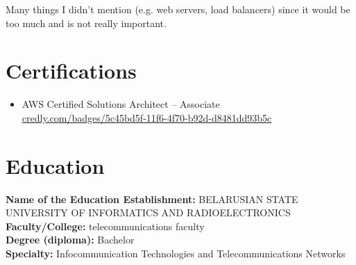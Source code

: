 \documentclass[11pt]{letter}
\newcommand{\forceindent}{\leavevmode{\parindent=1em\indent} %
}
\begin{document}
\forceindent Many things I didn't mention (e.g. web servers, load balancers) since it would be too much and is not really important.
\newpage

\section*{Certifications\vphantom{certs}}

\begin{itemize}
    \item AWS Certified Solutions Architect – Associate \\
    \href{https://www.credly.com/badges/5c45bd5f-11f6-4f70-b92d-d8481dd93b5c}{credly.com/badges/5c45bd5f-11f6-4f70-b92d-d8481dd93b5c}
\end{itemize}

\section*{Education\vphantom{edu}}

\textbf{Name of the Education Establishment:} BELARUSIAN STATE UNIVERSITY OF INFORMATICS AND RADIOELECTRONICS \\
\textbf{Faculty/College:} telecommunications faculty \\
\textbf{Degree (diploma):} Bachelor \\
\textbf{Specialty:} Infocommunication Technologies and Telecommunications Networks \\
\end{document}
